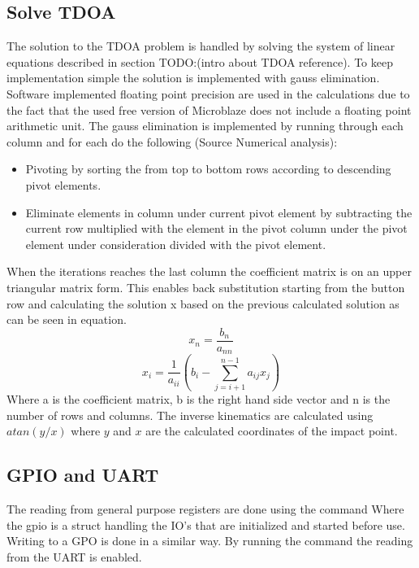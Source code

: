\subsection{Solve TDOA}
The solution to the TDOA problem is handled by solving the system of linear equations described in section TODO:(intro about TDOA reference). To keep implementation simple the solution is implemented with gauss elimination. Software implemented floating point precision are used in the calculations due to the fact that the used free version of Microblaze does not include a floating point arithmetic unit. 
The gauss elimination is implemented by running through each column and for each do the following (Source Numerical analysis):
\begin{itemize}
	\item Pivoting by sorting the from top to bottom rows according to descending pivot elements.
	\item Eliminate elements in column under current pivot element by subtracting the current row multiplied with the element in the pivot column under the pivot element under consideration divided with the pivot element.
\end{itemize}
When the iterations reaches the last column the coefficient matrix is on an upper triangular matrix form. This enables back substitution starting from the button row and calculating the solution x based on the previous calculated solution as can be seen in equation.
\begin{equation}
	x_n = \frac{b_n}{a_{nn}}
\end{equation}
%
\begin{equation}
	x_i = \frac{1}{a_{ii}} (b_i - \sum_{j=i+1}^{n-1} a_{ij}x_j)
\end{equation}
Where a is the coefficient matrix, b is the right hand side vector and n is the number of rows and columns.
%
The inverse kinematics are calculated using $atan(y/x)$ where $y$ and $x$ are the calculated coordinates of the impact point. 
%
\subsection{GPIO and UART}
The reading from general purpose registers are done using the command
Where the gpio is a struct handling the IO's that are initialized and started before use.
Writing to a GPO is done in a similar way.
By running the command  the reading from the UART is enabled.